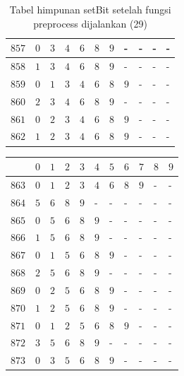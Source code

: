 \begin{appendices}
\begin{table}[H]
\begin{tabular} {|l|l|l|l|l|l|l|l|l|l|l|}
  		$ 857 $ & $ 0 $ &$ 3 $ &$ 4 $ &$ 6 $ &$ 8 $ &$ 9 $ & - &  - &  - &  -   \\ \hline
  		$ 858 $ & $ 1 $ &$ 3 $ &$ 4 $ &$ 6 $ &$ 8 $ &$ 9 $ & - &  - &  - &  -   \\ \hline
  		$ 859 $ & $ 0 $ &$ 1 $ &$ 3 $ &$ 4 $ &$ 6 $ &$ 8 $ &$ 9 $ & - &  - &  -   \\ \hline
  		$ 860 $ & $ 2 $ &$ 3 $ &$ 4 $ &$ 6 $ &$ 8 $ &$ 9 $ & - &  - &  - &  -   \\ \hline
  		$ 861 $ & $ 0 $ &$ 2 $ &$ 3 $ &$ 4 $ &$ 6 $ &$ 8 $ &$ 9 $ & - &  - &  -   \\ \hline
  		$ 862 $ & $ 1 $ &$ 2 $ &$ 3 $ &$ 4 $ &$ 6 $ &$ 8 $ &$ 9 $ & - &  - &  -   \\ \hline
  	\end{tabular}\caption{Tabel himpunan setBit setelah fungsi preprocess dijalankan (29)}
  	\label{tab:setbit_29}
  \end{table}
  \begin{table}[H]
  	\centering
  	\begin{tabular} {|l|l|l|l|l|l|l|l|l|l|l|} \hline
  		\backslashbox{$Num$}{$index$} & $ 0 $ & $ 1 $ & $ 2 $ & $ 3 $ & $ 4 $ & $ 5 $ & $ 6 $ & $ 7 $ & $ 8 $ & $ 9 $ \\ \hline
  		$ 863 $ & $ 0 $ &$ 1 $ &$ 2 $ &$ 3 $ &$ 4 $ &$ 6 $ &$ 8 $ &$ 9 $ & - &  -   \\ \hline
  		$ 864 $ & $ 5 $ &$ 6 $ &$ 8 $ &$ 9 $ & - &  - &  - &  - &  - &  -   \\ \hline
  		$ 865 $ & $ 0 $ &$ 5 $ &$ 6 $ &$ 8 $ &$ 9 $ & - &  - &  - &  - &  -   \\ \hline
  		$ 866 $ & $ 1 $ &$ 5 $ &$ 6 $ &$ 8 $ &$ 9 $ & - &  - &  - &  - &  -   \\ \hline
  		$ 867 $ & $ 0 $ &$ 1 $ &$ 5 $ &$ 6 $ &$ 8 $ &$ 9 $ & - &  - &  - &  -   \\ \hline
  		$ 868 $ & $ 2 $ &$ 5 $ &$ 6 $ &$ 8 $ &$ 9 $ & - &  - &  - &  - &  -   \\ \hline
  		$ 869 $ & $ 0 $ &$ 2 $ &$ 5 $ &$ 6 $ &$ 8 $ &$ 9 $ & - &  - &  - &  -   \\ \hline
  		$ 870 $ & $ 1 $ &$ 2 $ &$ 5 $ &$ 6 $ &$ 8 $ &$ 9 $ & - &  - &  - &  -   \\ \hline
  		$ 871 $ & $ 0 $ &$ 1 $ &$ 2 $ &$ 5 $ &$ 6 $ &$ 8 $ &$ 9 $ & - &  - &  -   \\ \hline
  		$ 872 $ & $ 3 $ &$ 5 $ &$ 6 $ &$ 8 $ &$ 9 $ & - &  - &  - &  - &  -   \\ \hline
  		$ 873 $ & $ 0 $ &$ 3 $ &$ 5 $ &$ 6 $ &$ 8 $ &$ 9 $ & - &  - &  - &  -   \\ \hline

\end{tabular}
\end{table}
\end{appendices}
